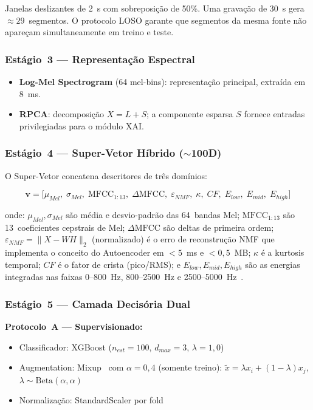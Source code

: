 Janelas deslizantes de 2~s com sobreposição de 50\%. Uma gravação de 30~s gera $\approx29$~segmentos.
O protocolo LOSO garante que segmentos da mesma fonte não apareçam simultaneamente em treino e teste.

\subsubsection{Estágio~3 --- Representação Espectral}

\begin{itemize}
    \item \textbf{Log-Mel Spectrogram} (64 mel-bins): representação principal, extraída em 8~ms.
    \item \textbf{RPCA}: decomposição $X = L + S$; a componente esparsa $S$ fornece entradas
    privilegiadas para o módulo XAI.
\end{itemize}

\subsubsection{Estágio~4 --- Super-Vetor Híbrido ($\sim$100D)}

O Super-Vetor concatena descritores de três domínios:

\begin{equation}
\mathbf{v} = \bigl[\mu_{Mel},\; \sigma_{Mel},\; \text{MFCC}_{1:13},\; \Delta\text{MFCC},\;
             \varepsilon_{NMF},\; \kappa,\; CF,\; E_{low},\; E_{mid},\; E_{high}\bigr]
\label{eq:supervector}
\end{equation}

\noindent onde: $\mu_{Mel}, \sigma_{Mel}$ são média e desvio-padrão das 64~bandas Mel; $\text{MFCC}_{1:13}$
são 13~coeficientes cepstrais de Mel; $\Delta\text{MFCC}$ são deltas de primeira ordem;
$\varepsilon_{NMF} = \|X - WH\|_2$ (normalizado) é o erro de reconstrução NMF que implementa o conceito
do Autoencoder em $<5$~ms e $<0{,}5$~MB; $\kappa$ é a kurtosis temporal; $CF$ é o fator de crista
(pico/RMS); e $E_{low}, E_{mid}, E_{high}$ são as energias integradas nas faixas 0--800~Hz, 800--2500~Hz
e 2500--5000~Hz~\cite{Khamaisi2025}.

\subsubsection{Estágio~5 --- Camada Decisória Dual}

\textbf{Protocolo~A --- Supervisionado:}
\begin{itemize}
    \item Classificador: XGBoost ($n_{est}{=}100$, $d_{max}{=}3$, $\lambda{=}1{,}0$)
    \item Augmentation: Mixup~\cite{Emon2025} com $\alpha{=}0{,}4$ (somente treino):
          $\tilde{x} = \lambda x_i + (1{-}\lambda)x_j$, $\lambda \sim \text{Beta}(\alpha,\alpha)$
    \item Normalização: StandardScaler por fold
\end{itemize}

